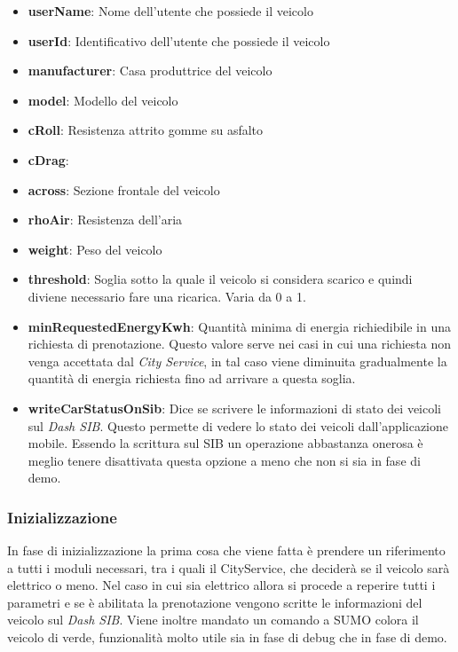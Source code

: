 \begin{itemize}
	\item \textbf{userName}: Nome dell'utente che possiede il veicolo
	\item \textbf{userId}: Identificativo dell'utente che possiede il veicolo
	\item \textbf{manufacturer}: Casa produttrice del veicolo
	\item \textbf{model}: Modello del veicolo
	\item \textbf{cRoll}: Resistenza attrito gomme su asfalto
	\item \textbf{cDrag}: 
	\item \textbf{across}: Sezione frontale del veicolo
	\item \textbf{rhoAir}: Resistenza dell'aria
	\item \textbf{weight}: Peso del veicolo
	\item \textbf{threshold}: Soglia sotto la quale il veicolo si considera scarico e quindi diviene necessario fare una ricarica. Varia da 0 a 1.
	\item \textbf{minRequestedEnergyKwh}: Quantità minima di energia richiedibile in una richiesta di prenotazione. Questo valore serve nei casi in cui una richiesta non venga accettata dal \emph{City Service}, in tal caso viene diminuita gradualmente la quantità di energia richiesta fino ad arrivare a questa soglia.
	\item \textbf{writeCarStatusOnSib}: Dice se scrivere le informazioni di stato dei veicoli sul \emph{Dash SIB}. Questo permette di vedere lo stato dei veicoli dall'applicazione mobile. Essendo la scrittura sul SIB un operazione abbastanza onerosa è meglio tenere disattivata questa opzione a meno che non si sia in fase di demo.
\end{itemize}


\subsubsection{Inizializzazione}

In fase di inizializzazione la prima cosa che viene fatta è prendere un riferimento a tutti i moduli necessari, tra i quali il CityService, che  deciderà se il veicolo sarà elettrico o meno. Nel caso in cui sia elettrico allora si procede a reperire tutti i parametri e se è abilitata la prenotazione vengono scritte le informazioni del veicolo sul \emph{Dash SIB}. Viene inoltre mandato un comando a SUMO colora il veicolo di verde, funzionalità molto utile sia in fase di debug che in fase di demo.

